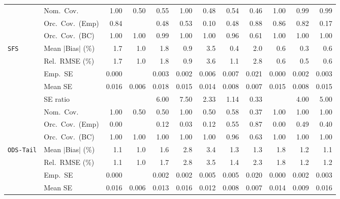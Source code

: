 \begin{landscape}
\begin{longtable}{llrrrrrrrrrr}
 & Nom.\ Cov. & \cellcolor{rankthree}1.00 & 0.50 & 0.55 & 1.00 & 0.48 & 0.54 & 0.46 & 1.00 & \cellcolor{rankone}0.99 & \cellcolor{ranktwo}0.99 \\
 & Orc.\ Cov.\ (Emp) & \cellcolor{rankthree}0.84 &  & 0.48 & 0.53 & 0.10 & 0.48 & \cellcolor{rankone}0.88 & \cellcolor{ranktwo}0.86 & 0.82 & 0.17 \\
 & Orc.\ Cov.\ (BC) & 1.00 & 1.00 & \cellcolor{ranktwo}0.99 & 1.00 & \cellcolor{rankthree}1.00 & \cellcolor{rankone}0.96 & 0.61 & 1.00 & 1.00 & 1.00 \\
\addlinespace[2pt]
\quad \texttt{SFS} & Mean $|$Bias$|$ (\%) & 1.7 & 1.0 & 1.8 & 0.9 & 3.5 & \cellcolor{ranktwo}0.4 & 2.0 & \cellcolor{rankthree}0.6 & \cellcolor{rankone}0.3 & 0.6 \\
 & Rel.\ RMSE (\%) & 1.7 & 1.0 & 1.8 & 0.9 & 3.6 & 1.1 & 2.8 & \cellcolor{ranktwo}0.6 & \cellcolor{rankone}0.5 & \cellcolor{rankthree}0.6 \\
 & Emp.\ SE & 0.000 &  & 0.003 & 0.002 & 0.006 & 0.007 & 0.021 & 0.000 & 0.002 & 0.003 \\
 & Mean SE & 0.016 & 0.006 & 0.018 & 0.015 & 0.014 & 0.008 & 0.007 & 0.015 & 0.008 & 0.015 \\
 & SE ratio &  &  & 6.00 & 7.50 & \cellcolor{rankthree}2.33 & \cellcolor{rankone}1.14 & \cellcolor{ranktwo}0.33 &  & 4.00 & 5.00 \\
 & Nom.\ Cov. & \cellcolor{ranktwo}1.00 & 0.50 & 0.50 & \cellcolor{rankthree}1.00 & 0.50 & 0.58 & 0.37 & 1.00 & \cellcolor{rankone}1.00 & 1.00 \\
 & Orc.\ Cov.\ (Emp) & 0.00 &  & 0.12 & 0.03 & 0.12 & \cellcolor{ranktwo}0.55 & \cellcolor{rankone}0.87 & 0.00 & \cellcolor{rankthree}0.49 & 0.40 \\
 & Orc.\ Cov.\ (BC) & \cellcolor{rankthree}1.00 & 1.00 & 1.00 & 1.00 & \cellcolor{ranktwo}1.00 & \cellcolor{rankone}0.96 & 0.63 & 1.00 & 1.00 & 1.00 \\
\addlinespace[2pt]
\quad \texttt{ODS-Tail} & Mean $|$Bias$|$ (\%) & \cellcolor{ranktwo}1.1 & \cellcolor{rankone}1.0 & 1.6 & 2.8 & 3.4 & 1.3 & 1.3 & 1.8 & 1.2 & \cellcolor{rankthree}1.1 \\
 & Rel.\ RMSE (\%) & \cellcolor{ranktwo}1.1 & \cellcolor{rankone}1.0 & 1.7 & 2.8 & 3.5 & 1.4 & 2.3 & 1.8 & 1.2 & \cellcolor{rankthree}1.2 \\
 & Emp.\ SE & 0.000 &  & 0.002 & 0.002 & 0.005 & 0.005 & 0.020 & 0.000 & 0.002 & 0.003 \\
 & Mean SE & 0.016 & 0.006 & 0.013 & 0.016 & 0.012 & 0.008 & 0.007 & 0.014 & 0.009 & 0.016 \\

\end{longtable}
\end{landscape}
